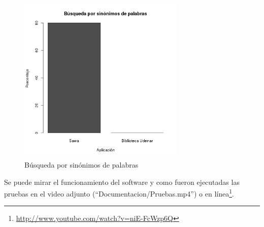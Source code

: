 \begin{description}
   \begin{figure}[!ht]
\begin{center}
\includegraphics[width=8cm]{pictures/p7.png}
\end{center}
\caption{Búsqueda por sinónimos de palabras} \label{figura:p7}
\end{figure}
 
\end{description}


Se puede mirar el funcionamiento del software y como fueron ejecutadas las pruebas
en el video adjunto  (``Documentacion/Pruebas.mp4'') o en línea\footnote{\url{http://www.youtube.com/watch?v=niE-FcWzp6Q}}.



